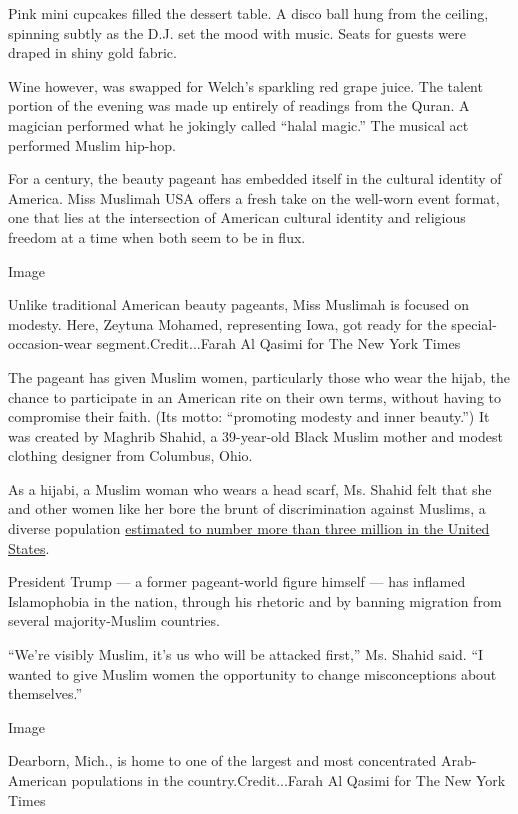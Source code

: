 Pink mini cupcakes filled the dessert table. A disco ball hung from the
ceiling, spinning subtly as the D.J. set the mood with music. Seats for
guests were draped in shiny gold fabric.

Wine however, was swapped for Welch's sparkling red grape juice. The
talent portion of the evening was made up entirely of readings from the
Quran. A magician performed what he jokingly called ``halal magic.'' The
musical act performed Muslim hip-hop.

For a century, the beauty pageant has embedded itself in the cultural
identity of America. Miss Muslimah USA offers a fresh take on the
well-worn event format, one that lies at the intersection of American
cultural identity and religious freedom at a time when both seem to be
in flux.

Image

Unlike traditional American beauty pageants, Miss Muslimah is focused on
modesty. Here, Zeytuna Mohamed, representing Iowa, got ready for the
special-occasion-wear segment.Credit...Farah Al Qasimi for The New York
Times

The pageant has given Muslim women, particularly those who wear the
hijab, the chance to participate in an American rite on their own terms,
without having to compromise their faith. (Its motto: ``promoting
modesty and inner beauty.'') It was created by Maghrib Shahid, a
39-year-old Black Muslim mother and modest clothing designer from
Columbus, Ohio.

As a hijabi, a Muslim woman who wears a head scarf, Ms. Shahid felt that
she and other women like her bore the brunt of discrimination against
Muslims, a diverse population
\href{https://www.pewresearch.org/fact-tank/2018/01/03/new-estimates-show-u-s-muslim-population-continues-to-grow/}{estimated
to number more than three million in the United States}.

President Trump --- a former pageant-world figure himself --- has
inflamed Islamophobia in the nation, through his rhetoric and by banning
migration from several majority-Muslim countries.

``We're visibly Muslim, it's us who will be attacked first,'' Ms. Shahid
said. ``I wanted to give Muslim women the opportunity to change
misconceptions about themselves.''

Image

Dearborn, Mich., is home to one of the largest and most concentrated
Arab-American populations in the country.Credit...Farah Al Qasimi for
The New York Times

